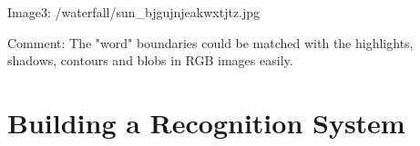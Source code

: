 \documentclass[11pt]{article} \usepackage{fullpage} \usepackage{graphicx} \usepackage{epstopdf} \usepackage{color} \usepackage{psfrag} \usepackage{pdfsync}\usepackage{indentfirst}\usepackage{subfigure}\usepackage{float}\usepackage[section]{placeins}
\begin{document}
\begin{figure}[H]
\centering
{}
\end{figure}

Image3: /waterfall/sun\_bjgujnjeakwxtjtz.jpg

\begin{figure}[H]
\centering
{}
\end{figure}
Comment: The "word" boundaries could be matched with the highlights, shadows, contours and blobs in RGB images easily.

\section{Building a Recognition System}
\setcounter{subsection}{4}
\end{document}
